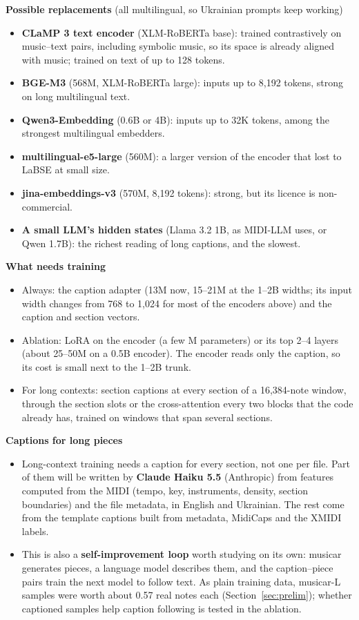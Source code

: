\documentclass[11pt,a4paper]{article}
\begin{document}
\medskip
\textbf{Possible replacements} (all multilingual, so Ukrainian prompts keep working)
\begin{itemize}
\item \textbf{CLaMP 3 text encoder} (XLM-RoBERTa base): trained contrastively on music--text pairs, including
symbolic music, so its space is already aligned with music; trained on text of up to 128 tokens.
\item \textbf{BGE-M3} (568M, XLM-RoBERTa large): inputs up to 8,192 tokens, strong on long multilingual text.
\item \textbf{Qwen3-Embedding} (0.6B or 4B): inputs up to 32K tokens, among the strongest multilingual embedders.
\item \textbf{multilingual-e5-large} (560M): a larger version of the encoder that lost to LaBSE at small size.
\item \textbf{jina-embeddings-v3} (570M, 8,192 tokens): strong, but its licence is non-commercial.
\item \textbf{A small LLM's hidden states} (Llama 3.2 1B, as MIDI-LLM uses, or Qwen 1.7B): the richest reading of
long captions, and the slowest.
\end{itemize}

\medskip
\textbf{What needs training}
\begin{itemize}
\item Always: the caption adapter (13M now, 15--21M at the 1--2B widths; its input width changes from 768 to 1,024 for most of the
encoders above) and the caption and section vectors.
\item Ablation: LoRA on the encoder (a few M parameters) or its top 2--4 layers (about 25--50M on a 0.5B encoder).
The encoder reads only the caption, so its cost is small next to the 1--2B trunk.
\item For long contexts: section captions at every section of a 16,384-note window, through the section slots or the
cross-attention every two blocks that the code already has, trained on windows that span several sections.
\end{itemize}

\medskip
\textbf{Captions for long pieces}
\begin{itemize}
\item Long-context training needs a caption for every section, not one per file. Part of them will be written by
\textbf{Claude Haiku 5.5} (Anthropic) from features computed from the MIDI (tempo, key, instruments, density, section
boundaries) and the file metadata, in English and Ukrainian. The rest come from the template captions built from
metadata, MidiCaps and the XMIDI labels.
\item This is also a \textbf{self-improvement loop} worth studying on its own: musicar generates pieces, a language
model describes them, and the caption--piece pairs train the next model to follow text. As plain training data,
musicar-L samples were worth about 0.57 real notes each (Section~\ref{sec:prelim}); whether captioned samples help
caption following is tested in the ablation.
\end{itemize}
\end{document}
